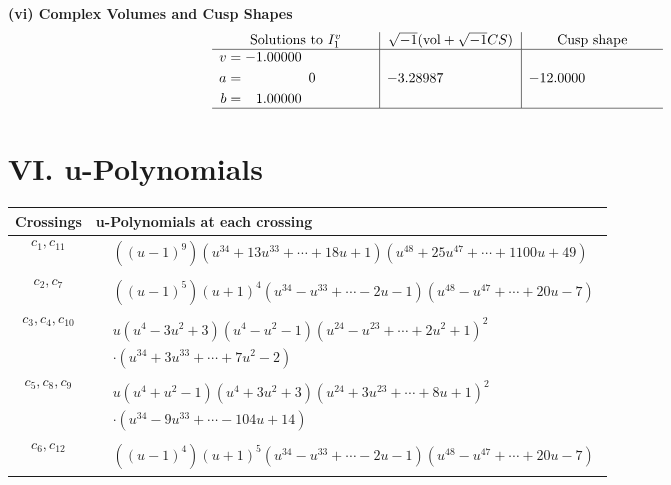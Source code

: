 \documentclass[1p]{elsarticle_modified}
\theoremstyle{definition}
\newcommand{\I}{\sqrt{-1}}
\begin{document}
\newpage\flushleft \textbf{(vi) Complex Volumes and Cusp Shapes}
$$\begin{array}{c|c|c}  
\text{Solutions to }I^v_{1}& \I (\text{vol} + \sqrt{-1}CS) & \text{Cusp shape}\\
 \hline 
\begin{aligned}
v &= -1.00000\phantom{ +0.000000I} \\
a &= \phantom{-0.000000 } 0 \\
b &= \phantom{-}1.00000\phantom{ +0.000000I}\end{aligned}
 & -3.28987\phantom{ +0.000000I} & -12.0000\phantom{ +0.000000I}\\
 \hline 
 \end{array}$$\newpage
\newpage\renewcommand{\arraystretch}{1}
\centering \section*{ VI. u-Polynomials}
\begin{tabular}{m{50pt}|m{274pt}}
Crossings & \hspace{64pt}u-Polynomials at each crossing \\
\hline $$\begin{aligned}c_{1},c_{11}\end{aligned}$$&$\begin{aligned}
&((u-1)^9)(u^{34}+13 u^{33}+\cdots+18 u+1)(u^{48}+25 u^{47}+\cdots+1100 u+49)
\end{aligned}$\\
\hline $$\begin{aligned}c_{2},c_{7}\end{aligned}$$&$\begin{aligned}
&((u-1)^5)(u+1)^4(u^{34}- u^{33}+\cdots-2 u-1)(u^{48}-u^{47}+\cdots+20 u-7)
\end{aligned}$\\
\hline $$\begin{aligned}c_{3},c_{4},c_{10}\end{aligned}$$&$\begin{aligned}
&u(u^4-3 u^2+3)(u^4- u^2-1)(u^{24}-u^{23}+\cdots+2 u^{2}+1)^{2}\\
&\cdot(u^{34}+3 u^{33}+\cdots+7 u^2-2)
\end{aligned}$\\
\hline $$\begin{aligned}c_{5},c_{8},c_{9}\end{aligned}$$&$\begin{aligned}
&u(u^4+u^2-1)(u^4+3 u^2+3)(u^{24}+3 u^{23}+\cdots+8 u+1)^{2}\\
&\cdot(u^{34}-9 u^{33}+\cdots-104 u+14)
\end{aligned}$\\
\hline $$\begin{aligned}c_{6},c_{12}\end{aligned}$$&$\begin{aligned}
&((u-1)^4)(u+1)^5(u^{34}- u^{33}+\cdots-2 u-1)(u^{48}-u^{47}+\cdots+20 u-7)
\end{aligned}$\\
\hline
\end{tabular}\newpage\renewcommand{\arraystretch}{1}
\end{document}
